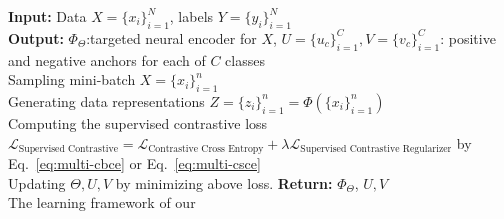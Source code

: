 \begin{algorithm}[!th]
\SetAlgoLined
    \textbf{Input:} Data $X=\{x_i\}_{i=1}^{N}$, labels $Y = \{y_i\}_{i=1}^{N}$ \\
    \textbf{Output:} $\Phi_{\Theta}$:targeted neural encoder for $X$, $U=\{u_c\}_{i=1}^{C}, V=\{v_c\}_{i=1}^{C}$: positive and negative anchors for each of $C$ classes\\
{
     Sampling mini-batch $X=\{x_i\}_{i=1}^{n}$ \\
     Generating data representations $Z=\{z_i\}_{i=1}^{n} = \Phi(\{x_i\}_{i=1}^{n})$ \\
     Computing  the supervised contrastive loss $\mathcal{L}_{\text{Supervised Contrastive} }  = \mathcal{L}_{\text{Contrastive Cross Entropy} }  + \lambda \mathcal{L}_{\text{Supervised Contrastive Regularizer}} $  by Eq.~\ref{eq:multi-cbce} or Eq.~\ref{eq:multi-csce} \\
     Updating $\Theta, U, V$ by minimizing above loss. 
}
\quad \textbf{Return:} $\Phi_{\Theta}$, $U, V$\\
    \caption{ The learning framework of our \model \label{alg:scehr}}
\end{algorithm}

